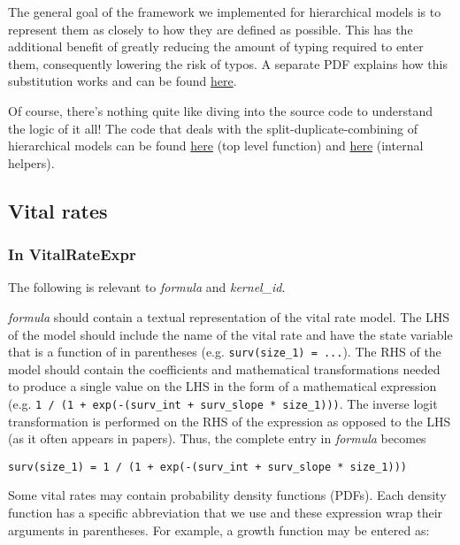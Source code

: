 \documentclass[]{article}
\begin{document}
The general goal of the framework we implemented for hierarchical models
is to represent them as closely to how they are defined as possible.
This has the additional benefit of greatly reducing the amount of typing
required to enter them, consequently lowering the risk of typos. A
separate PDF explains how this substitution works and can be found
\href{https://github.com/levisc8/Padrino/blob/master/metadata/Hierarchical_effects_subbing_schematic.pdf}{here}.

Of course, there's nothing quite like diving into the source code to
understand the logic of it all! The code that deals with the
split-duplicate-combining of hierarchical models can be found
\href{https://github.com/levisc8/RPadrino/blob/master/R/split_ranefs.R}{here}
(top level function) and
\href{https://github.com/levisc8/RPadrino/blob/master/R/split_ranefs_helpers.R}{here}
(internal helpers).

\subsection{Vital rates}\label{vital-rates}

\subsubsection{In VitalRateExpr}\label{in-vitalrateexpr}

The following is relevant to \emph{formula} and \emph{kernel\_id}.

\emph{formula} should contain a textual representation of the vital rate
model. The LHS of the model should include the name of the vital rate
and have the state variable that is a function of in parentheses (e.g.
\texttt{surv(size\_1)\ =\ ...}). The RHS of the model should contain the
coefficients and mathematical transformations needed to produce a single
value on the LHS in the form of a mathematical expression (e.g.
\texttt{1\ /\ (1\ +\ exp(-(surv\_int\ +\ surv\_slope\ *\ size\_1)))}.
The inverse logit transformation is performed on the RHS of the
expression as opposed to the LHS (as it often appears in papers). Thus,
the complete entry in \emph{formula} becomes

\texttt{surv(size\_1)\ =\ 1\ /\ (1\ +\ exp(-(surv\_int\ +\ surv\_slope\ *\ size\_1)))}

Some vital rates may contain probability density functions (PDFs). Each
density function has a specific abbreviation that we use and these
expression wrap their arguments in parentheses. For example, a growth
function may be entered as:
\end{document}

